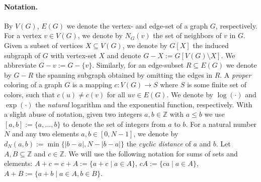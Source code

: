 \documentclass[a4paper,10pt,hidelinks]{amsart}
\theoremstyle{definition}
\begin{document}
\paragraph*{\textbf{Notation.}} By $V(G)$, $E(G)$ we denote the vertex- and edge-set of a graph $G$, respectively. For a vertex $v\in V(G)$, we denote by $N_G(v)$ the set of neighbors of $v$ in $G$.  
Given a subset of vertices $X\subseteq V(G)$, we denote by $G[X]$ the induced subgraph of $G$ with vertex-set $X$ and denote $G-X:=G[V(G)\setminus X]$. We abbreviate $G-v:=G-\{v\}$. Similarly, for an edge-subset $R\subseteq E(G)$ we denote by $G-R$ the spanning subgraph obtained by omitting the edges in $R$. A \emph{proper} coloring of a graph $G$ is a mapping $c:V(G)\rightarrow S$ where $S$ is some finite set of colors, such that $c(u)\neq c(v)$ for all $uv\in E(G)$. We denote by $\log(\cdot)$ and $\exp(\cdot)$ the \emph{natural} logarithm and the exponential function, respectively. With a slight abuse of notation, given two integers $a,b\in \mathbb{Z}$ with $a\le b$ we use $[a,b]:=\{a,\ldots,b\}$ to denote the set of integers from $a$ to $b$. For a natural number $N$ and any two elements $a, b \in [0,N-1]$, we denote by $d_N(a, b) := \min\{|b-a|, N - |b-a|\}$ the \emph{cyclic distance} of $a$ and $b$. Let $A, B \subseteq \mathbb Z$ and $c \in \mathbb Z$. We will use the following notation for sums of sets and elements:
    $A + c=c+A := \{a + c \mid a \in A\}$,
    $cA := \{ca \mid a \in A\}$,
    $A + B := \{a + b \mid a \in A, b\in B\}$.

\medskip
\end{document}
